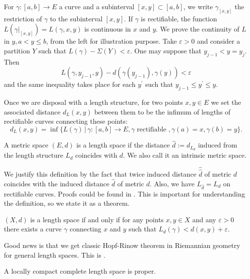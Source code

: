 \begin{rmk}
	\label{rmk:curve_continuity_endpoints}
	For $\gamma : [a, b] \rightarrow E$ a curve and a subinterval $[x , y] \subset [a,b]$,
	we write $\gamma_{[x , y]}$ the restriction of $\gamma$ to the subinterval $[x , y]$.
	If \( \gamma \) is rectifiable,
	the function \( L \left( \gamma | _ { [ x , y ] } \right) = L ( \gamma , x , y ) \) is continuous
	in \( x \) and \( y \).
	We prove the continuity of \( L \) in \( y , a < y \leq b \),
	from the left for illustration purpose.
	Take \( \varepsilon > 0 \) and
	consider a partition \( Y \) such that \( L ( \gamma ) - \Sigma ( Y ) < \varepsilon \). One may suppose that
	\( y _ { j - 1 } < y = y _ { j } \). Then
	\[
		L \left( \gamma , y _ { j - 1 } , y \right) - d \left( \gamma \left( y _ { j - 1 } \right) , \gamma ( y ) \right) < \varepsilon
	\]
	and the same inequality takes place for each $y^\prime$ such that $y_{j-1} \leq y^\prime \leq y$.
\end{rmk}

Once we are disposal with a length structure,
for two points \( x , y \in E \) we set the associated distance \( d_L ( x , y ) \) between them to be the infimum of lengths of rectifiable curves connecting these points:
\[
	d _ { L } ( x , y ) = \inf \{ L ( \gamma ) \,|\, \gamma: [ a , b ] \rightarrow E , \gamma \text{ rectifiable }, \gamma ( a ) = x , \gamma ( b ) = y \}.
\]

\begin{defn}
	\label{defn:length_space}
	A metric space $(E,d)$ is a length space if the distance $\hat{d} := d_{L_{d}}$ induced
	from the length structure $L_d$ coincides with $d$. We also call it an intrinsic metric space.
\end{defn}

We justify this definition by the fact that
twice induced distance $\hat{\hat{d}}$ of metric $d$ coincides with the induced distance $\hat{d}$ of metric $d$.
Also, we have $L_{\hat{d}} = L_{d}$ on rectifiable curves.
Proofs could be found in \cite[Section 2.3]{burago2001course}.
This is important for understanding the definition,
so we state it as a theorem.

\begin{thm}
	\( ( X , d ) \) is a length space if and only if for any points
	\( x , y \in X \) and any \( \varepsilon > 0 \) there exists a curve \( \gamma \) connecting \( x \) and \( y \) such
	that \( L _ { d } ( \gamma ) < d ( x , y ) + \varepsilon \).
\end{thm}

Good news is that we get classic Hopf-Rinow theorem in Riemannian geometry for general length spaces.
This is \cite[Proposition 2.5.22]{burago2001course}.

\begin{prop}
	A locally compact complete length space is proper.
\end{prop}
